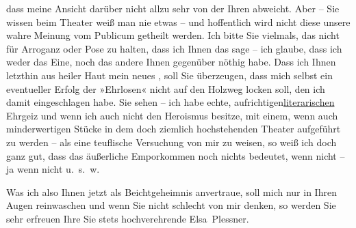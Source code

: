                dass meine Ansicht darüber nicht allzu sehr von der Ihren abweicht. Aber – Sie wissen
               beim Theater weiß man nie etwas – und hoffentlich wird nicht diese unsere wahre
               Meinung vom Publicum getheilt werden. Ich bitte Sie vielmals, das nicht für Arroganz
               oder Pose zu halten, dass ich Ihnen das sage – ich glaube, dass ich weder das Eine,
               noch das andere Ihnen gegenüber {\pb}nöthig habe. Dass ich Ihnen letzthin aus
               heiler Haut mein neues \label{K_L03725-3v}\label{K_L03725-3}, soll Sie überzeugen, dass mich selbst ein eventueller Erfolg der »Ehrlosen« nicht auf den Holzweg locken soll, den
               ich damit eingeschlagen habe. Sie sehen – ich habe echte, aufrichtige\introOben{}n\introOben{}{ }\uline{literarischen}
               Ehrgeiz und wenn ich auch nicht den Heroismus besitze, mit einem, wenn auch
               minderwertigen Stücke in dem doch
               ziemlich hochstehenden Theater aufgeführt zu werden – als eine teuflische Versuchung
               von mir zu {\pb}weisen, so weiß ich doch ganz gut, dass das äußerliche
               Emporkommen noch nichts bedeutet, wenn nicht – ja wenn nicht u. s. w.\pend
           
\pstart
           Was ich also
               Ihnen jetzt als Beichtgeheimnis anvertraue, soll mich nur in Ihren Augen reinwaschen
               und wenn Sie nicht schlecht von mir denken, so werden Sie sehr erfreuen Ihre Sie stets
               hochverehrende\pend
           \pstart \spacefill\mbox{Elsa Plessner}.\pend{}\endnumbering{}
\begin{anhang}
\end{anhang}
      